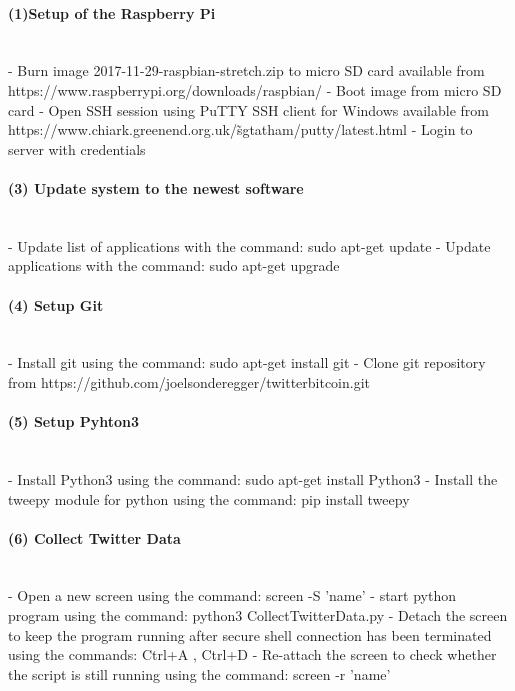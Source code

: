 \documentclass[a4paper,12pt]{article}
\begin{document}
\begin{spacing}{1.2}
\paragraph{(1)Setup of the Raspberry Pi}\mbox{}\\
- Burn image 2017-11-29-raspbian-stretch.zip to micro SD card available from \newline https://www.raspberrypi.org/downloads/raspbian/ \newline
- Boot image from micro SD card \newline
- Open SSH session using PuTTY SSH client for Windows available from \newline https://www.chiark.greenend.org.uk/\~sgtatham/putty/latest.html \newline
- Login to server with credentials \newline

\paragraph{(3) Update system to the newest software}\mbox{}\\
- Update list of applications with the command: sudo apt-get update \newline
- Update applications with the command: sudo apt-get upgrade \newline

\paragraph{(4) Setup Git}\mbox{}\\
- Install git using the command: sudo apt-get install git \newline
- Clone git repository from https://github.com/joelsonderegger/twitterbitcoin.git \newline

\paragraph{(5) Setup Pyhton3}\mbox{}\\
- Install Python3 using the command: sudo apt-get install Python3 \newline
- Install the tweepy module for python using the command: pip install tweepy \newline

\paragraph{(6) Collect Twitter Data}\mbox{}\\
- Open a new screen using the command: screen -S 'name' \newline
- start python program using the command: python3 CollectTwitterData.py \newline
- Detach the screen to keep the program running after secure shell connection has been terminated using the commands: Ctrl+A , Ctrl+D \newline
- Re-attach the screen to check whether the script is still running using the command: screen -r 'name' \newline


\end{spacing}
\end{document}
